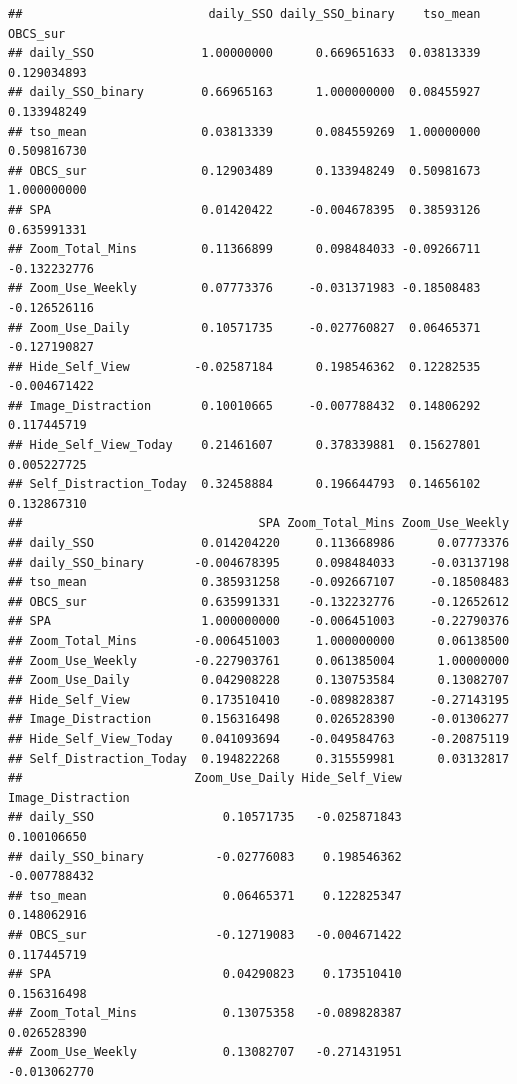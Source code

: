 \documentclass[
  english,
  man]{apa7}
\begin{document}
\begin{verbatim}
##                          daily_SSO daily_SSO_binary    tso_mean     OBCS_sur
## daily_SSO               1.00000000      0.669651633  0.03813339  0.129034893
## daily_SSO_binary        0.66965163      1.000000000  0.08455927  0.133948249
## tso_mean                0.03813339      0.084559269  1.00000000  0.509816730
## OBCS_sur                0.12903489      0.133948249  0.50981673  1.000000000
## SPA                     0.01420422     -0.004678395  0.38593126  0.635991331
## Zoom_Total_Mins         0.11366899      0.098484033 -0.09266711 -0.132232776
## Zoom_Use_Weekly         0.07773376     -0.031371983 -0.18508483 -0.126526116
## Zoom_Use_Daily          0.10571735     -0.027760827  0.06465371 -0.127190827
## Hide_Self_View         -0.02587184      0.198546362  0.12282535 -0.004671422
## Image_Distraction       0.10010665     -0.007788432  0.14806292  0.117445719
## Hide_Self_View_Today    0.21461607      0.378339881  0.15627801  0.005227725
## Self_Distraction_Today  0.32458884      0.196644793  0.14656102  0.132867310
##                                 SPA Zoom_Total_Mins Zoom_Use_Weekly
## daily_SSO               0.014204220     0.113668986      0.07773376
## daily_SSO_binary       -0.004678395     0.098484033     -0.03137198
## tso_mean                0.385931258    -0.092667107     -0.18508483
## OBCS_sur                0.635991331    -0.132232776     -0.12652612
## SPA                     1.000000000    -0.006451003     -0.22790376
## Zoom_Total_Mins        -0.006451003     1.000000000      0.06138500
## Zoom_Use_Weekly        -0.227903761     0.061385004      1.00000000
## Zoom_Use_Daily          0.042908228     0.130753584      0.13082707
## Hide_Self_View          0.173510410    -0.089828387     -0.27143195
## Image_Distraction       0.156316498     0.026528390     -0.01306277
## Hide_Self_View_Today    0.041093694    -0.049584763     -0.20875119
## Self_Distraction_Today  0.194822268     0.315559981      0.03132817
##                        Zoom_Use_Daily Hide_Self_View Image_Distraction
## daily_SSO                  0.10571735   -0.025871843       0.100106650
## daily_SSO_binary          -0.02776083    0.198546362      -0.007788432
## tso_mean                   0.06465371    0.122825347       0.148062916
## OBCS_sur                  -0.12719083   -0.004671422       0.117445719
## SPA                        0.04290823    0.173510410       0.156316498
## Zoom_Total_Mins            0.13075358   -0.089828387       0.026528390
## Zoom_Use_Weekly            0.13082707   -0.271431951      -0.013062770

\end{verbatim}
\end{document}
